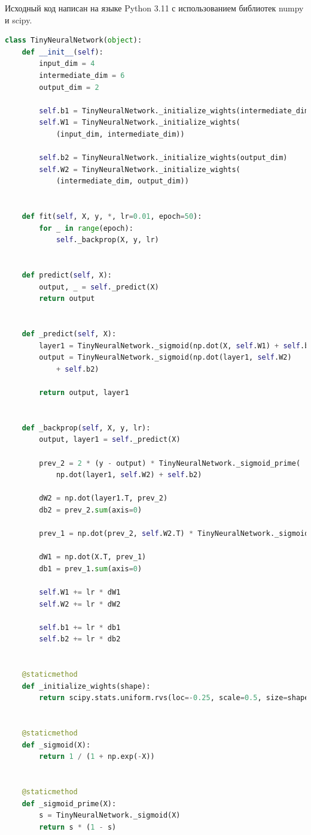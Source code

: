 \documentclass[12pt, a4paper]{extarticle}
\begin{document}
Исходный код написан на языке Python 3.11 с использованием библиотек numpy и scipy.
\begin{lstlisting}[language=python]
class TinyNeuralNetwork(object):
    def __init__(self):
        input_dim = 4
        intermediate_dim = 6
        output_dim = 2
        
        self.b1 = TinyNeuralNetwork._initialize_wights(intermediate_dim)
        self.W1 = TinyNeuralNetwork._initialize_wights(
            (input_dim, intermediate_dim))
            
        self.b2 = TinyNeuralNetwork._initialize_wights(output_dim)
        self.W2 = TinyNeuralNetwork._initialize_wights(
            (intermediate_dim, output_dim))
    
    
    def fit(self, X, y, *, lr=0.01, epoch=50):
        for _ in range(epoch):
            self._backprop(X, y, lr)
            
    
    def predict(self, X):
        output, _ = self._predict(X)
        return output
    
    
    def _predict(self, X):
        layer1 = TinyNeuralNetwork._sigmoid(np.dot(X, self.W1) + self.b1)
        output = TinyNeuralNetwork._sigmoid(np.dot(layer1, self.W2) 
            + self.b2)
            
        return output, layer1
    
    
    def _backprop(self, X, y, lr):
        output, layer1 = self._predict(X)
        
        prev_2 = 2 * (y - output) * TinyNeuralNetwork._sigmoid_prime(
            np.dot(layer1, self.W2) + self.b2)
        
        dW2 = np.dot(layer1.T, prev_2)
        db2 = prev_2.sum(axis=0)
        
        prev_1 = np.dot(prev_2, self.W2.T) * TinyNeuralNetwork._sigmoid_prime(np.dot(X, self.W1) + self.b1)
        
        dW1 = np.dot(X.T, prev_1)
        db1 = prev_1.sum(axis=0)
        
        self.W1 += lr * dW1
        self.W2 += lr * dW2

        self.b1 += lr * db1
        self.b2 += lr * db2
    
    
    @staticmethod
    def _initialize_wights(shape):
        return scipy.stats.uniform.rvs(loc=-0.25, scale=0.5, size=shape)
    
    
    @staticmethod
    def _sigmoid(X):
        return 1 / (1 + np.exp(-X))
    
    
    @staticmethod
    def _sigmoid_prime(X):
        s = TinyNeuralNetwork._sigmoid(X)
        return s * (1 - s)
\end{lstlisting}
\end{document}
